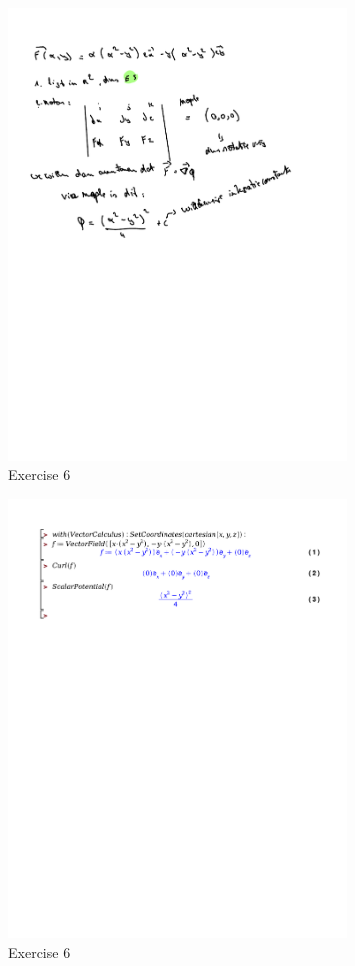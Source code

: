 \documentclass[a4paper]{report}
\begin{document}
\begin{figure}[H]
	\centering
	\includegraphics[width=0.8\textwidth]{assets/huis_6_ex_6.pdf}
	\caption{Exercise 6}
	\label{fig:huis_6_ex_6}
\end{figure}

\begin{figure}[H]
	\centering
	\includegraphics[width=0.8\textwidth]{exercises/huis_6_ex_6.pdf}
	\caption{Exercise 6}
	\label{fig:huis_6_ex_6_maple}
\end{figure}
\end{document}
